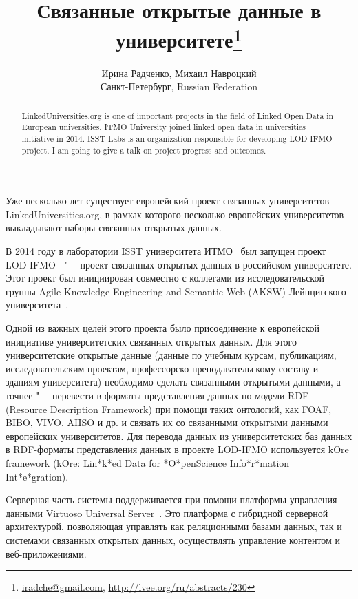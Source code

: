 \documentclass[10pt, a5paper]{article}
\begin{document}
\title{Связанные открытые данные в университете\footnote{\url{iradche@gmail.com}, \url{http://lvee.org/ru/abstracts/230}}}
\author{Ирина Радченко, Михаил Навроцкий \\Санкт-Петербург, Russian Federation}
\maketitle
\begin{abstract}
LinkedUniversities.org is one of important projects in the field of Linked Open Data in European universities.
ITMO \linebreak University joined linked open data in universities initiative in 2014. ISST Labs is an organization responsible for developing LOD-IFMO project. I am going to give a talk on project progress and outcomes.
\end{abstract}
Уже несколько лет существует европейский проект связанных университетов LinkedUniversities.org, в рамках которого несколько европейских университетов выкладывают наборы связанных открытых данных.

В 2014 году в лаборатории ISST университета ИТМО~\cite{Radchenko1} был запущен проект LOD-IFMO~\cite{Radchenko2} "--- проект связанных открытых данных в российском университете. Этот проект был инициирован совместно с коллегами из исследовательской группы Agile Knowledge Engineering and Semantic Web (AKSW) Лейпцигского университета~\cite{Radchenko3}.

Одной из важных целей этого проекта было присоединение к европейской инициативе университетских связанных открытых данных. Для этого университетские открытые данные (данные по учебным курсам, публикациям, исследовательским проектам, \linebreak профессорско-преподавательскому составу и зданиям университета) необходимо сделать связанными открытыми данными, а точнее "--- перевести в форматы представления данных по модели RDF (Resource Description Framework) при помощи таких онтологий, как FOAF, BIBO, VIVO, AIISO и др. и связать их со связанными открытыми данными европейских университетов. Для перевода данных из университетских баз данных в RDF-форматы представления данных в проекте LOD-IFMO используется kOre framework (kOre: Lin*k*ed Data for *O*penScience Info*r*mation Int*e*gration).

Cерверная часть системы поддерживается при помощи платформы управления данными Virtuoso Universal Server~\cite{Radchenko4}. Это платформа с гибридной серверной архитектурой, позволяющая управлять как реляционными базами данных, так и системами связанных открытых данных, осуществлять управление контентом и веб-приложениями.
\end{document}
